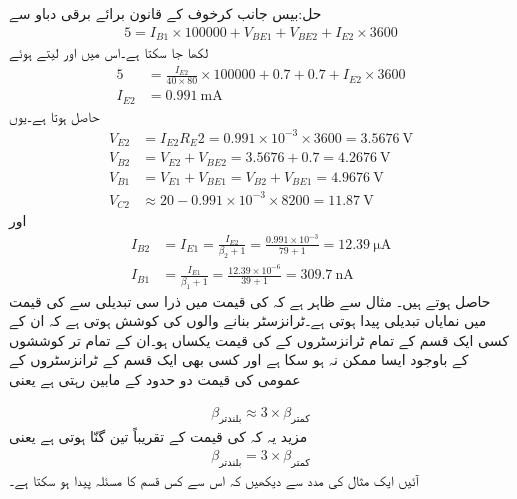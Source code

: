حل:بیس جانب کرخوف کے قانون برائے برقی دباو سے
\begin{align*}
5=I_{B1} \times 100000+V_{BE1}+V_{BE2}+I_{E2} \times 3600
\end{align*}
لکھا جا سکتا ہے۔اس میں  اور  لیتے ہوئے
\begin{align*}
5&=\frac{I_{E2}}{40 \times 80} \times 100000+0.7+0.7+I_{E2} \times 3600\\
I_{E2}&=\SI{0.991}{\milli \ampere}
\end{align*}
حاصل ہوتا ہے۔یوں
\begin{align*}
V_{E2}&=I_{E2} R_E2=0.991 \times 10^{-3} \times 3600=\SI{3.5676}{\volt}\\
V_{B2}&=V_{E2}+V_{BE2}=3.5676+0.7=\SI{4.2676}{\volt}\\
V_{B1}&=V_{E1}+V_{BE1}=V_{B2}+V_{BE1}=\SI{4.9676}{\volt}\\
V_{C2}& \approx 20-0.991 \times 10^{-3} \times  8200=\SI{11.87}{\volt}
\end{align*}
اور
\begin{align*}
I_{B2}&=I_{E1}=\frac{I_{E2}}{\beta_2+1}=\frac{0.991 \times 10^{-3}}{79+1}=\SI{12.39}{\micro \ampere}\\
I_{B1}&=\frac{I_{E1}}{\beta_1+1}=\frac{12.39 \times 10^{-6}}{39+1}=\SI{309.7}{\nano \ampere}
\end{align*}
حاصل ہوتے ہیں۔
 \label{حصہ_تبدیلی_بٹا_سے_نکتہ_کارکردگی_کا_سرک_جانا}
مثال  سے ظاہر ہے کہ  کی قیمت میں ذرا سی تبدیلی سے  کی قیمت میں نمایاں تبدیلی پیدا ہوتی ہے۔ٹرانزسٹر بنانے والوں کی کوشش ہوتی ہے کہ ان کے کسی  ایک قسم کے تمام ٹرانزسٹروں کے  کی قیمت یکساں ہو۔ان کے تمام تر کوششوں کے باوجود ایسا ممکن نہ ہو سکا ہے اور کسی بھی ایک قسم کے ٹرانزسٹروں کے عمومی    کی قیمت دو حدود کے مابین رہتی ہے یعنی

\begin{align}
\beta_{\text{بلندتر}} \approx  3 \times \beta_{\text{کمتر}}
\end{align}
مزید یہ کہ  کی قیمت  کے تقریباً تین گنّا ہوتی ہے یعنی
\begin{align}
\beta_{\text{بلندتر}} =   { 3 \times \beta_{\text{کمتر}}}
\end{align}
آئیں ایک مثال کی مدد سے دیکھیں کہ اس سے کس قسم کا مسئلہ پیدا ہو سکتا ہے۔

